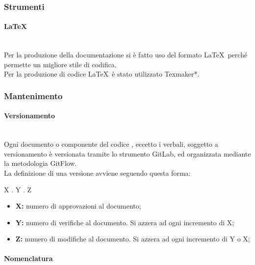 \documentclass[11pt,a4paper]{article}
\begin{document}
	\subsubsection{Strumenti}
	
	\paragraph{\LaTeX}
	\noindent \\ Per la produzione della documentazione si è fatto uso del formato \LaTeX\ perché permette un migliore stile di codifica.\\
	Per la produzione di codice \LaTeX\ è stato utilizzato Texmaker*.
	
	\subsubsection{Mantenimento}
	
	\paragraph{Versionamento}
\noindent \\ Ogni documento o componente del codice , eccetto i verbali, soggetto a versionamento è versionata tramite lo strumento GitLab, ed organizzata mediante la metodologia GitFlow.\\
La definizione di una versione avviene seguendo questa forma:
\begin{center}
	X . Y . Z
\end{center}

\begin{itemize}
	\item \textbf{X:} numero di approvazioni al documento;
	\item \textbf{Y:} numero di verifiche al documento. Si azzera ad ogni incremento di X;
	\item \textbf{Z:} numero di modifiche al documento. Si azzera ad ogni incremento di Y o X;
\end{itemize}

\paragraph{Nomenclatura}
\end{document}
